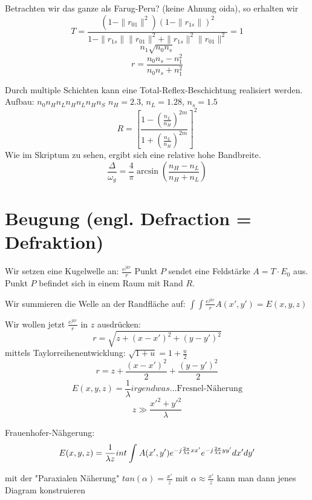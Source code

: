 \documentclass[a4paper]{article}
\begin{document}
Betrachten wir das ganze als Farug-Peru? (keine Ahnung oida), so erhalten wir
\[ T=\frac{(1-\|r_{01}\|^{2})(1-\|r_{1s}\|)^{2}}{1-\|r_{1s}\|\|r_{01}\|^{2}+\|r_{1s}\|^{2}\|r_{01}\|^{2}}=1 \]
\[ n_{1}\sqrt{n_{0}n_{s}}  \]
\[ r=\frac{n_{0}n_{s}-n_{1}^{2}}{n_{0}n_{s}+n_{1}^{2}} \]

Durch multiple Schichten kann eine Total-Reflex-Beschichtung realisiert werden.
Aufbau: $n_{0}n_{H}n_{L}n_{H}n_{L}n_{H}n_{S}$ 
$n_{H}=2.3$, $n_{L}=1.28$, $n_{s}=1.5$
\[ R=[\frac{1-(\frac{n_{L}}{n_{H}})^{2m}}{1+(\frac{n_{L}}{n_{H}})^{2m}}]^{2} \]
Wie im Skriptum zu sehen, ergibt sich eine relative hohe Bandbreite.
\[ \frac{\Delta}{\omega_{g}}=\frac{4}{\pi}\arcsin(\frac{n_{H}-n_{L}}{n_{H}+n_{L}}) \]

\section*{Beugung (engl. Defraction = Defraktion)}
Wir setzen eine Kugelwelle an: $\frac{e^{jkr}}{r}$ 
Punkt $P$ sendet eine Feldstärke $A=T\cdot E_{0}$ aus. Punkt $P$ befindet sich in einem Raum mit Rand  $R$.

Wir summieren die Welle an der Randfläche auf: $\int\int \frac{e^{jkr}}{r}A(x',y')=E(x,y,z)$

Wir wollen jetzt $\frac{e^{jkr}}{r}$ in $z$ ausdrücken:
\[ r=\sqrt{z +(x-x')^{2} + (y-y')^{2}} \]
mittels Taylorreihenentwicklung: $\sqrt{1+u}=1+\frac{u}{2} $
 \[ r=z+\frac{(x-x')^{2}}{2}+\frac{(y-y')^{2}}{2} \]
 \[ E(x,y,z)=\frac{1}{\lambda} irgendwas \text{\ldots Fresnel-Näherung} \]
\[ z\gg \frac{x'^{2}+y'^{2}}{\lambda} \]

Frauenhofer-Nähgerung:
\[ E(x,y,z)=\frac{1}{\lambda z} \\int_{}^{} \int_{}^{} A(x',y')e^{-j \frac{2\pi}{\lambda z}x x'}e^{-j \frac{2\pi}{\lambda z}y y'} dx'dy' \]

mit der "Paraxialen Näherung" $tan(\alpha)=\frac{x'}{z}$ mit $\alpha \approx \frac{x'}{z}$ kann man dann jenes Diagram konstruieren
\end{document}
